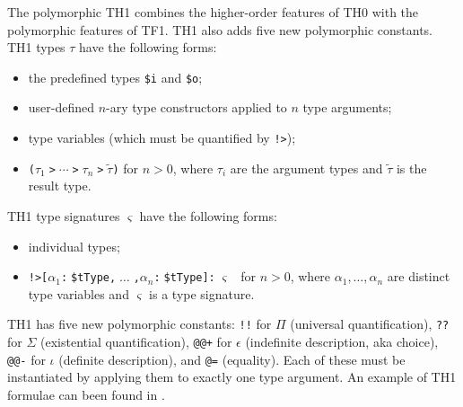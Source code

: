 \documentclass{easychair}
\begin{document}
The polymorphic TH1 combines the higher-order features of TH0 
with the polymorphic features of TF1.
TH1 also adds five new polymorphic constants.
TH1 types $\tau$ have the following forms:
\begin{itemize}
\item the predefined types {\tt \$i} and {\tt \$o};
\item user-defined $n$-ary type constructors applied to $n$ type arguments;
\item type variables (which must be quantified by {\tt !>});
\item {\tt ($\tau_1\;$>$\;{\cdots}\;$>$\;\tau_n\;$>$\;\tilde \tau$)}
      for $n > 0$, where $\tau_i$ are the argument types and $\tilde \tau$
      is the result type.
\end{itemize}
TH1 type signatures $\varsigma$ have the following forms:
\begin{itemize}
\item individual types;
\item {\tt !>[$\alpha_1$:$\;$\$tType,$\;{\dots}\;$,$\alpha_n$:$\;$\$tType]:$\;\varsigma$}
\ for $n > 0$, where $\alpha_1,\dots,\alpha_n$ are distinct
type variables and $\varsigma$ is a type signature.
\end{itemize}
TH1 has five new polymorphic constants:
{\tt !!} for $\Pi$ (universal quantification),
{\tt ??} for $\Sigma$ (existential quantification),
{\tt @@+} for $\epsilon$ (indefinite description, aka choice),
{\tt @@-} for $\iota$ (definite description), 
and  
{\tt @=} (equality).
Each of these must be instantiated by applying them to exactly one type 
argument.
An example of TH1 formulae can been found in \cite{KSR16}.
% 
\end{document}
